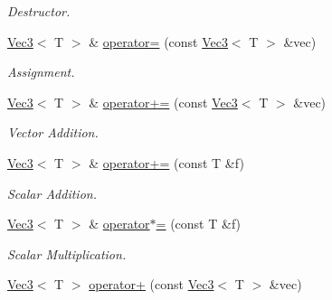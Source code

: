 \begin{DoxyCompactItemize}
\begin{DoxyCompactList}\small\item\em Destructor. \item\end{DoxyCompactList}\item 
\hypertarget{classMath_1_1Vec3_a7e3714da30bf1c9efc9c13b618ded427}{
\hyperlink{classMath_1_1Vec3}{Vec3}$<$ T $>$ \& \hyperlink{classMath_1_1Vec3_a7e3714da30bf1c9efc9c13b618ded427}{operator=} (const \hyperlink{classMath_1_1Vec3}{Vec3}$<$ T $>$ \&vec)}
\label{classMath_1_1Vec3_a7e3714da30bf1c9efc9c13b618ded427}

\begin{DoxyCompactList}\small\item\em Assignment. \item\end{DoxyCompactList}\item 
\hypertarget{classMath_1_1Vec3_a70659636b7316c754d03d3e09e77230d}{
\hyperlink{classMath_1_1Vec3}{Vec3}$<$ T $>$ \& \hyperlink{classMath_1_1Vec3_a70659636b7316c754d03d3e09e77230d}{operator+=} (const \hyperlink{classMath_1_1Vec3}{Vec3}$<$ T $>$ \&vec)}
\label{classMath_1_1Vec3_a70659636b7316c754d03d3e09e77230d}

\begin{DoxyCompactList}\small\item\em Vector Addition. \item\end{DoxyCompactList}\item 
\hypertarget{classMath_1_1Vec3_ac7d887f8ff179b1e0cee4f24f56ce2eb}{
\hyperlink{classMath_1_1Vec3}{Vec3}$<$ T $>$ \& \hyperlink{classMath_1_1Vec3_ac7d887f8ff179b1e0cee4f24f56ce2eb}{operator+=} (const T \&f)}
\label{classMath_1_1Vec3_ac7d887f8ff179b1e0cee4f24f56ce2eb}

\begin{DoxyCompactList}\small\item\em Scalar Addition. \item\end{DoxyCompactList}\item 
\hypertarget{classMath_1_1Vec3_a91e22994e9b66efe40418a42edff67b3}{
\hyperlink{classMath_1_1Vec3}{Vec3}$<$ T $>$ \& \hyperlink{classMath_1_1Vec3_a91e22994e9b66efe40418a42edff67b3}{operator$\ast$=} (const T \&f)}
\label{classMath_1_1Vec3_a91e22994e9b66efe40418a42edff67b3}

\begin{DoxyCompactList}\small\item\em Scalar Multiplication. \item\end{DoxyCompactList}\item 
\hypertarget{classMath_1_1Vec3_a354a10cb7a15bd7d89a471055d301963}{
\hyperlink{classMath_1_1Vec3}{Vec3}$<$ T $>$ \hyperlink{classMath_1_1Vec3_a354a10cb7a15bd7d89a471055d301963}{operator+} (const \hyperlink{classMath_1_1Vec3}{Vec3}$<$ T $>$ \&vec)}
\label{classMath_1_1Vec3_a354a10cb7a15bd7d89a471055d301963}


\end{DoxyCompactItemize}
